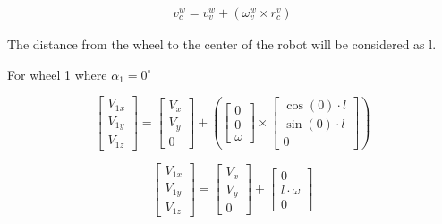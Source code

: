 \documentclass[answers]{exam}
\begin{document}
\begin{questions}
\begin{parts}
\begin{solution}
            \begin{align*}
                v^w_c = v^w_v + ({\omega}^w_v \times r^v_c)
            \end{align*}

            The distance from the wheel to the center of the robot will be considered as l. 

            For wheel 1 where $\alpha_1 = 0^\circ$

            \begin{equation*}
                \begin{bmatrix}
                    V_{1x}  \\
                    V_{1y} \\
                    V_{1z}
                \end{bmatrix}
                = \begin{bmatrix}
                    V_x \\
                    V_y \\
                    0
                \end{bmatrix} 
                + \left(\begin{bmatrix}
                    0 \\
                    0 \\
                    \omega
                \end{bmatrix} \times \begin{bmatrix}
                    \cos(0) \cdot l \\
                    \sin(0) \cdot l \\
                    0
                \end{bmatrix}\right)
            \end{equation*}

            \begin{equation*}
                \begin{bmatrix}
                    V_{1x}  \\
                    V_{1y} \\
                    V_{1z}
                \end{bmatrix}
                = \begin{bmatrix}
                    V_x \\
                    V_y \\
                    0
                \end{bmatrix} 
                + \begin{bmatrix}
                    0 \\
                    l \cdot \omega \\
                    0
                \end{bmatrix}
            \end{equation*}


\end{solution}
\end{parts}
\end{questions}
\end{document}
